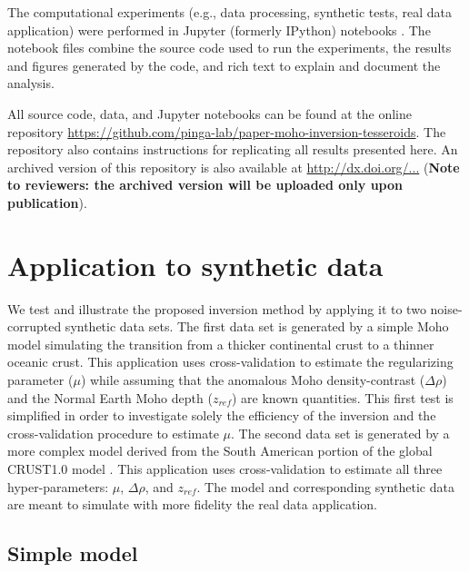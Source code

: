 \documentclass[extra]{gji}
\begin{document}
The computational experiments
(e.g., data processing, synthetic tests, real data application)
were performed in
Jupyter (formerly IPython) notebooks
\citep[][ \url{http://jupyter.org/}]{perez2007}.
The notebook files combine the source code used to run the experiments,
the results and figures generated by the code,
and rich text to explain and document the analysis.

All source code, data, and Jupyter notebooks
can be found at the online repository
\url{https://github.com/pinga-lab/paper-moho-inversion-tesseroids}.
The repository also contains instructions for replicating all results presented
here.
An archived version of this repository is also available at
\url{http://dx.doi.org/...}
(\textbf{Note to reviewers: the archived version will be uploaded only upon
publication}).


\section{Application to synthetic data}

We test and illustrate the proposed inversion method
by applying it to two noise-corrupted synthetic data sets.
The first data set is generated by a simple Moho model simulating the transition
from a thicker continental crust to a thinner oceanic crust.
This application uses cross-validation to estimate the regularizing parameter
($\mu$) while assuming that the anomalous Moho density-contrast ($\Delta\rho$)
and the Normal Earth Moho depth ($z_{ref}$) are known quantities.
This first test is simplified in order to investigate solely
the efficiency of the inversion and
the cross-validation procedure to estimate $\mu$.
The second data set is generated by a more complex model derived from
the South American portion of the global CRUST1.0 model \citep{laske2013}.
This application uses cross-validation to estimate all three hyper-parameters:
$\mu$, $\Delta\rho$, and $z_{ref}$.
The model and corresponding synthetic data are meant to simulate
with more fidelity the real data application.


\subsection{Simple model}\label{sec:simple-synthetic}
\end{document}
